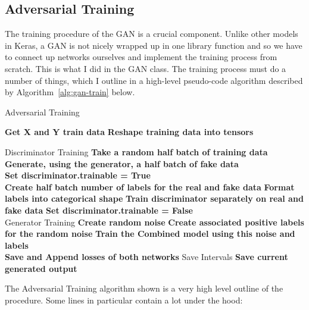 \documentclass[12pt,a4paper,twoside]{report}
\begin{document}
\subsection{Adversarial Training}

The training procedure of the GAN is a crucial component. Unlike other models in Keras, a GAN is not nicely wrapped up in one library function and so we have to connect up networks ourselves and implement the training process from scratch. This is what I did in the GAN class. The training process must do a number of things, which I outline in a high-level pseudo-code algorithm described by Algorithm~\ref{alg:gan-train} below.

\begin{algorithm}[!htbp]
\caption{Adversarial Training }\label{alg:gan-train}
\begin{algorithmic}[1]
	
        \State \textbf{Get X and Y train data}
        \State \textbf{Reshape training data into tensors} 
        \State 
         
		\State
		\Comment Discriminator Training 
		\State \textbf{Take a random half batch of training data}
		\State \textbf{Generate, using the generator, a half batch of fake data}\\
		\State \textbf{Set discriminator.trainable = True}\\
		\State \textbf{Create half batch number of labels for the real and fake data}
		\State \textbf{Format labels into categorical shape}
		\State \textbf{Train discriminator separately on real and fake data}
		\State \textbf{Set discriminator.trainable = False}\\
		\State
		\Comment Generator Training 
		\State \textbf{Create random noise} 
		\State \textbf{Create associated positive labels for the random noise}
		\State \textbf{Train the Combined model using this noise and labels}\\
		\State \textbf{Save and Append losses of both networks }
		\State
		\Comment Save Intervals
			\State \textbf{Save current generated output}
		\EndIf
   	\EndFor
   
\EndProcedure
\end{algorithmic}
\end{algorithm}

The Adversarial Training algorithm shown is a very high level outline of the procedure. Some lines in particular contain a lot under the hood:
\end{document}
